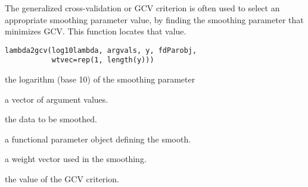 \documentclass{article}
\begin{document}
\begin{Description}\relax
The generalized cross-validation or GCV criterion is often
used to select an appropriate smoothing parameter value, by
finding the smoothing parameter that minimizes GCV.  This
function locates that value.
\end{Description}
\begin{Usage}
\begin{verbatim}
lambda2gcv(log10lambda, argvals, y, fdParobj,
           wtvec=rep(1, length(y)))
\end{verbatim}
\end{Usage}
\begin{Arguments}
\begin{ldescription}
\item[\code{log10lambda}] the logarithm (base 10) of the smoothing parameter

\item[\code{argvals}] a vector of argument values.

\item[\code{y}] the data to be smoothed.

\item[\code{fdParobj}] a functional parameter object defining the smooth.

\item[\code{wtvec}] a weight vector used in the smoothing.

\end{ldescription}
\end{Arguments}
\begin{Value}
the value of the GCV criterion.
\end{Value}
\end{document}
